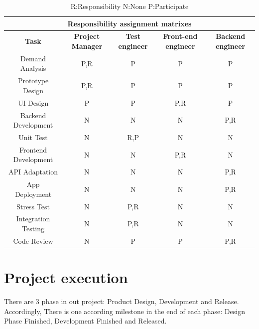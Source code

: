 \documentclass[runningheads]{llncs}
\begin{document}
\begin{table}
\centering
\begin{tabular}{|c|c|c|c|c|}
\hline
\multicolumn{5}{|c|}{\textbf{Responsibility assignment matrixes}}\\ %
\hline
\textbf{Task}&\textbf{Project Manager}&\textbf{Test engineer}&\textbf{Front-end engineer}&\textbf{Backend engineer}\\
\hline
Demand Analysis&P,R&P&P&P\\
\hline
Prototype Design&P,R&P&P&P\\
\hline
UI Design&P&P&P,R&P\\
\hline
Backend Development&N&N&N&P,R\\
\hline
Unit Test&N&R,P&N&N\\
\hline
Frontend Development&N&N&P,R&N\\
\hline
API Adaptation&N&N&N&P,R\\
\hline
App Deployment&N&N&N&P,R\\
\hline
Stress Test&N&P,R&N&N\\
\hline
Integration Testing&N&P,R&N&N\\
\hline
Code Review&N&P&P&P,R\\
\hline

\end{tabular}
\caption{R:Responsibility  N:None  P:Participate}
\end{table}

\section{Project execution}

There are 3 phase in out project: Product Design, Development and Release. Accordingly, There is one according milestone in the end of each phase: Design Phase Finished, Development Finished and  Released.
\end{document}
